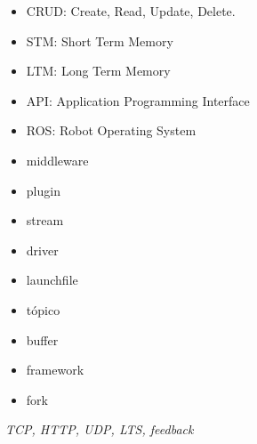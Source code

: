 \begin{glosario}\label{chapter:glosario}




\begin{itemize}
\item CRUD: Create, Read, Update, Delete.
\item STM: Short Term Memory
\item LTM: Long Term Memory
\item API: Application Programming Interface
\item ROS: Robot Operating System
\item middleware
\item plugin
\item stream
\item driver
\item launchfile
\item tópico
\item buffer
\item framework
\item fork
\end{itemize}

\textit{TCP, HTTP, UDP, LTS, feedback}

\end{glosario}	
